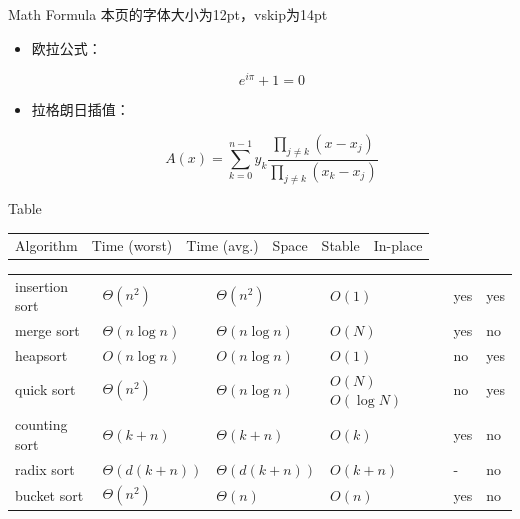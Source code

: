 \begin{frame}{Math Formula}
	\fontsize{12pt}{14pt}\selectfont %
	本页的字体大小为12pt，vskip为14pt
	\begin{itemize}
		\item 欧拉公式：

		      $$e^{i\pi}+1=0$$
		\item 拉格朗日插值：

		      $$A(x)=\sum_{k=0}^{n-1}y_k\frac{\prod_{j\ne k}(x-x_j)}{\prod_{j\ne k}(x_k-x_j)}$$

	\end{itemize}

\end{frame}


\begin{frame}{Table}
	\begin{block}
		{
			\centering
			\begin{tabularx}{\dimexpr{}\tabcolsep}{@{}p{0.2\textwidth}@{}p{}@{}p{}@{}p{}@{}p{}@{}p{}}
				Algorithm & Time (worst) & Time (avg.) & Space & Stable & In-place
			\end{tabularx}
		}%
		\centering
		\begin{tabularx}{\dimexpr{}\tabcolsep}{@{}p{}@{}p{}@{}p{}@{}p{}@{}p{}@{}p{}}

			insertion sort & $\Theta(n^2)$      & $\Theta(n^2)$      & $O(1)$               & yes & yes \\
			merge sort     & $\Theta(n\log{n})$ & $\Theta(n\log{n})$ & $O(N)$               & yes & no  \\
			heapsort       & $O(n\log{n})$      & $O(n\log{n})$      & $O(1)$               & no  & yes \\
			quick sort     & $\Theta(n^2)$      & $\Theta(n\log{n})$ & $O(N)$  $O(\log{N})$ & no  & yes \\
			counting sort  & $\Theta(k+n)$      & $\Theta(k+n)$      & $O(k)$               & yes & no  \\
			radix sort     & $\Theta(d(k+n))$   & $\Theta(d(k+n))$   & $O(k+n)$             & -   & no  \\
			bucket sort    & $\Theta(n^2)$      & $\Theta(n)$        & $O(n) $              & yes & no
		\end{tabularx}%
	\end{block}%
\end{frame}

